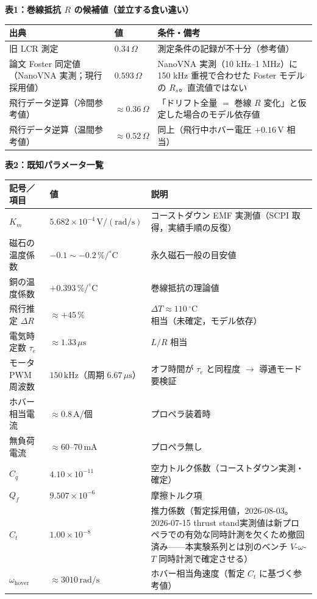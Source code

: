 \documentclass[a4paper,11pt]{ltjsarticle}
\newcommand{\expfield}[1]{\medskip\noindent\textbf{#1}\par\nobreak\smallskip\noindent}
\begin{document}
\expfield{表1：巻線抵抗 $R$ の候補値（並立する食い違い）}
\begin{tabular}{@{}p{48mm}p{28mm}p{75mm}@{}}
\toprule
出典 & 値 & 条件・備考 \\
\midrule
旧 LCR 測定 & $0.34\,\Omega$ & 測定条件の記録が不十分（参考値） \\
論文 Foster 同定値（NanoVNA 実測；現行採用値） & $0.593\,\Omega$ & NanoVNA 実測（10 kHz--1 MHz）に 150 kHz 重視で合わせた Foster モデルの $R_s$。直流値ではない \\
飛行データ逆算（冷間参考値） & $\approx 0.36\,\Omega$ & 「ドリフト全量 $=$ 巻線 $R$ 変化」と仮定した場合のモデル依存値 \\
飛行データ逆算（温間参考値） & $\approx 0.52\,\Omega$ & 同上（飛行中ホバー電圧 $+0.16\,\mathrm{V}$ 相当） \\
\bottomrule
\end{tabular}

\expfield{表2：既知パラメータ一覧}
\begin{tabular}{@{}p{40mm}p{45mm}p{66mm}@{}}
\toprule
記号／項目 & 値 & 説明 \\
\midrule
$K_m$ & $5.682\times10^{-4}\,\mathrm{V/(rad/s)}$ & コーストダウン EMF 実測値（SCPI 取得，実績手順の反復）\\
磁石の温度係数 & $-0.1 \sim -0.2\,\%/^\circ\mathrm{C}$ & 永久磁石一般の目安値 \\
銅の温度係数 & $+0.393\,\%/^\circ\mathrm{C}$ & 巻線抵抗の理論値 \\
飛行推定 $\Delta R$ & $\approx +45\,\%$ & $\Delta T \approx 110\,^\circ\mathrm{C}$ 相当（未確定，モデル依存） \\
電気時定数 $\tau_e$ & $\approx 1.33\,\mu\mathrm{s}$ & $L/R$ 相当 \\
モータ PWM 周波数 & $150\,\mathrm{kHz}$（周期 $6.67\,\mu\mathrm{s}$） & オフ時間が $\tau_e$ と同程度 $\to$ 導通モード要検証 \\
ホバー相当電流 & $\approx 0.8\,\mathrm{A}$/個 & プロペラ装着時 \\
無負荷電流 & $\approx 60$--$70\,\mathrm{mA}$ & プロペラ無し \\
$C_q$ & $4.10\times10^{-11}$ & 空力トルク係数（コーストダウン実測・確定） \\
$Q_f$ & $9.507\times10^{-6}$ & 摩擦トルク項 \\
$C_t$ & $1.00\times10^{-8}$ & 推力係数（暫定採用値，2026-08-03。2026-07-15 thrust stand実測値は新プロペラでの有効な同時計測を欠くため撤回済み——本実験系列とは別のベンチ $V$-$\omega$-$T$ 同時計測で確定させる） \\
$\omega_\mathrm{hover}$ & $\approx 3010\,\mathrm{rad/s}$ & ホバー相当角速度（暫定 $C_t$ に基づく参考値） \\
\bottomrule
\end{tabular}
\end{document}
